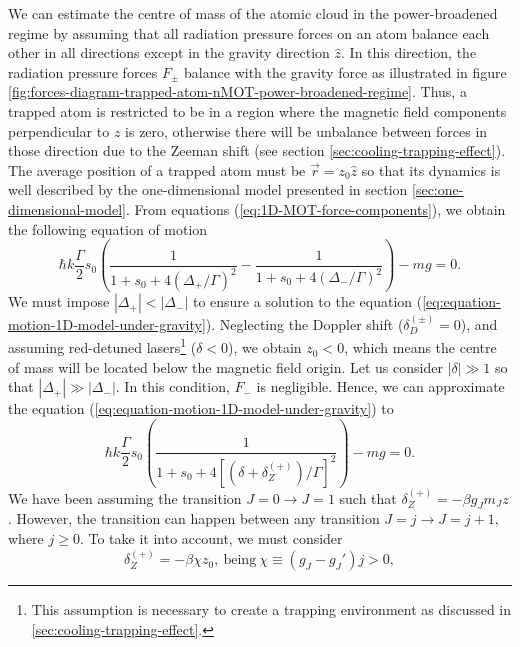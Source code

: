 We can estimate the centre of mass of the atomic cloud in the power-broadened regime by assuming that all radiation pressure forces on an atom balance each other in all directions except in the gravity direction $ \hat{z} $. In this direction, the radiation pressure forces $ F_{\pm} $ balance with the gravity force as illustrated in figure \ref{fig:forces-diagram-trapped-atom-nMOT-power-broadened-regime}. Thus, a trapped atom is restricted to be in a region where the magnetic field components perpendicular to $ z $ is zero, otherwise there will be unbalance between forces in those direction due to the Zeeman shift (see section \ref{sec:cooling-trapping-effect}). The average position of a trapped atom must be $ \vec{r} = z_0 \hat{z} $ so that its dynamics is well described by the one-dimensional model presented in section \ref{sec:one-dimensional-model}. From equations (\ref{eq:1D-MOT-force-components}), we obtain the following equation of motion
\begin{equation}
    \hbar k \frac{\Gamma}{2} s_0 \left( \frac{1}{1 + s_0 + 4(\Delta_{+} / \Gamma)^2} - \frac{1}{1 + s_0 + 4(\Delta_{-} / \Gamma)^2}  \right) - mg = 0.
    \label{eq:equation-motion-1D-model-under-gravity}
\end{equation}
We must impose $ |\Delta_{+}| < |\Delta_{-}| $ to ensure a solution to the equation (\ref{eq:equation-motion-1D-model-under-gravity}). Neglecting the Doppler shift ($ \delta_{D}^{(\pm)} = 0 $), and assuming red-detuned lasers\footnote{This assumption is necessary to create a trapping environment as discussed in \ref{sec:cooling-trapping-effect}.} ($ \delta < 0 $), we obtain $ z_0 < 0 $, which means the centre of mass will be located below the magnetic field origin. Let us consider $ |\delta| \gg 1 $ so that $ |\Delta_{+}| \gg |\Delta_{-}| $. In this condition, $ F_{-} $ is negligible. Hence, we can approximate the equation (\ref{eq:equation-motion-1D-model-under-gravity}) to
\begin{equation}
    \hbar k \frac{\Gamma}{2} s_0 \left( \frac{1}{1 + s_0 + 4[(\delta + \delta_{Z}^{(+)}) / \Gamma]^2}\right) - mg = 0.
\end{equation}
We have been assuming the transition $ J = 0 \longrightarrow J = 1 $ such that $ \delta_Z^{(+)} = - \beta g_J m_J z $. However, the transition can happen between any transition $ J = j \longrightarrow J = j + 1$, where $ j \geq 0 $. To take it into account, we must consider
\begin{equation}
     \delta_Z^{(+)} = - \beta \chi z_0,\ \textrm{being}\ \chi \equiv (g_J - g_J') j > 0,
     \label{eq:zeeman-shift-generic-transition}
\end{equation}
